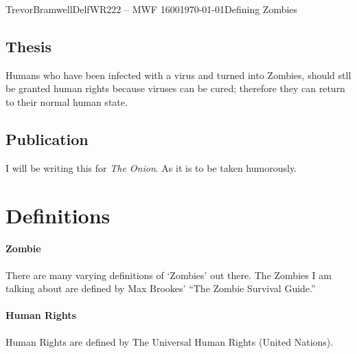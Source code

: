 \documentclass[12pt,letterpaper]{article}
\begin{document}
\begin{mla}{Trevor}{Bramwell}{Delf}{WR222 -- MWF 1600}{\today}{Defining Zombies}

\subsection*{Thesis}
Humans who have been infected with a virus and turned into Zombies, should
stll be granted human rights because viruses can be cured; therefore they can
return to their normal human state.
\subsection*{Publication}
I will be writing this for \emph{The Onion}. As it is to be taken humorously.

\section*{Definitions}
\paragraph{Zombie}
There are many varying definitions of `Zombies' out there. The Zombies I am
talking about are defined by Max Brookes' ``The Zombie Survival Guide.''

\paragraph{Human Rights}
Human Rights are defined by The Universal Human Rights (United Nations).


\end{mla}
\end{document}
